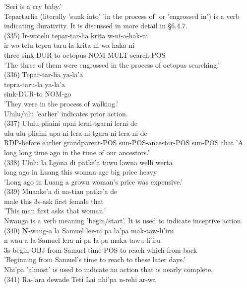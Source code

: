 \documentclass[10pt]{article}
\begin{document}
'Seri is a cry baby.'\\
Tepartarlia (literally 'sunk into' 'in the process of' or 'engrossed in') is a verb indicating durativity. It is discussed in more detail in §6.4.7.\\
(335) Ir-wotelu tepar-tar-lia krita w-ni-a-hak-ni\\
ir-wo-telu tepra-taru-la krita ni-wa-haka-ni\\
three sink-DUR-to octopus NOM-MULT-search-POS\\
'The three of them were engrossed in the process of octopus searching.'\\
(336) Tepar-tar-lia ya-la'a\\
tepra-taru-la ya-la'a\\
sink-DUR-to NOM-go\\
'They were in the process of walking.'\\
Ululu/ulu 'earlier' indicates prior action.\\
(337) Ululu pliaini upni lerni-tgarni lerni de\\
ulu-ulu pliaini upa-ni-lera-ni-tgara-ni-lera-ni de\\
RDP-before earlier grandparent-POS sun-POS-ancestor-POS sun-POS that 'A long long time ago in the time of our ancestors.'\\
(338) Ululu la Lgona di patke'a tuwu lawna welli werta\\
long ago in Luang this woman age big price heavy\\
'Long ago in Luang a grown woman's price was expensive.'\\
(339) Muanke'a di na-tian patke'a de\\
male this 3s-ask first female that\\
'This man first asks that woman.'\\
Nwauga is a verb meaning 'begin/start'. It is used to indicate inceptive action.\\
(340) \(\boldsymbol{N}\)-waug-a la Samuel ler-ni pa la'pa mak-taw-li'iru\\
n-wau-a la Samuel lera-ni pa la'pa maka-tawu-li'iru\\
3s-begin-OBJ from Samuel time-POS to reach which-from-back\\
'Beginning from Samuel's time to reach to these later days.'\\
Nhi'pa 'almost' is used to indicate an action that is nearly complete.\\
(341) Ra-'ara dewade Teti Lai nhi'pa n-rehi ar-wa
\end{document}
